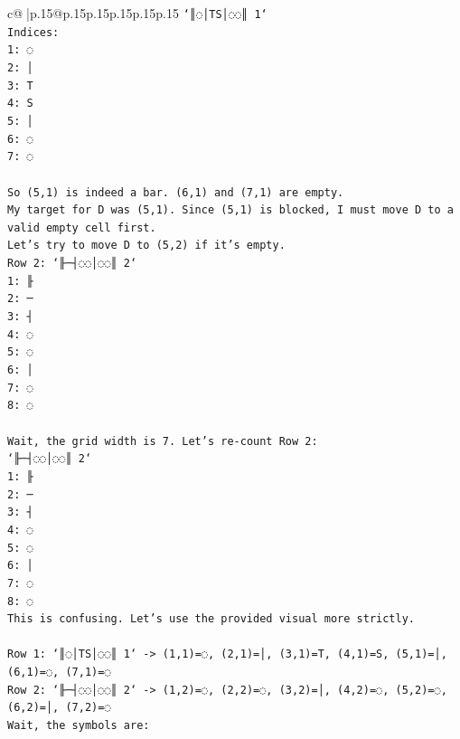 \documentclass{article}
\begin{document}
{\begin{supertabular}{c@{$\;$}|p{.15\linewidth}@{}p{.15\linewidth}p{.15\linewidth}p{.15\linewidth}p{.15\linewidth}p{.15\linewidth}}
{{{\texttt{`║◌│TS│◌◌║ 1`} \\
\texttt{Indices:} \\
\texttt{1: ◌} \\
\texttt{2: │} \\
\texttt{3: T} \\
\texttt{4: S} \\
\texttt{5: │} \\
\texttt{6: ◌} \\
\texttt{7: ◌} \\
\\ 
\texttt{So (5,1) is indeed a bar. (6,1) and (7,1) are empty.} \\
\texttt{My target for D was (5,1). Since (5,1) is blocked, I must move D to a valid empty cell first.} \\
\texttt{Let's try to move D to (5,2) if it's empty.} \\
\texttt{Row 2: `╟─┤◌◌│◌◌║ 2`} \\
\texttt{1: ╟} \\
\texttt{2: ─} \\
\texttt{3: ┤} \\
\texttt{4: ◌} \\
\texttt{5: ◌} \\
\texttt{6: │} \\
\texttt{7: ◌} \\
\texttt{8: ◌} \\
\\ 
\texttt{Wait, the grid width is 7. Let's re{-}count Row 2:} \\
\texttt{`╟─┤◌◌│◌◌║ 2`} \\
\texttt{1: ╟} \\
\texttt{2: ─} \\
\texttt{3: ┤} \\
\texttt{4: ◌} \\
\texttt{5: ◌} \\
\texttt{6: │} \\
\texttt{7: ◌} \\
\texttt{8: ◌} \\
\texttt{This is confusing. Let's use the provided visual more strictly.} \\
\\ 
\texttt{Row 1: `║◌│TS│◌◌║ 1` {-}> (1,1)=◌, (2,1)=│, (3,1)=T, (4,1)=S, (5,1)=│, (6,1)=◌, (7,1)=◌} \\
\texttt{Row 2: `╟─┤◌◌│◌◌║ 2` {-}> (1,2)=◌, (2,2)=◌, (3,2)=│, (4,2)=◌, (5,2)=◌, (6,2)=│, (7,2)=◌} \\
\texttt{Wait, the symbols are:} \\
}}}
\end{supertabular}}
\end{document}
